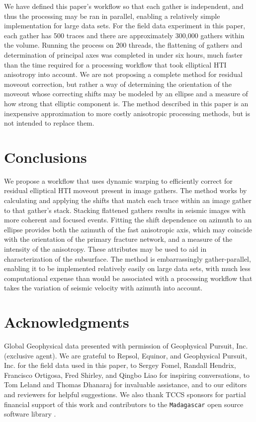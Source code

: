 We have defined this paper's workflow so that each gather is independent, and thus the processing may be ran in parallel, enabling a relatively simple implementation for large data sets.  For the field data experiment in this paper, each gather has 500 traces and there are approximately 300,000 gathers within the volume.  Running the process on 200 threads, the flattening of gathers and determination of principal axes was completed in under six hours, much faster than the time required for a processing workflow that took elliptical HTI anisotropy into account.  We are not proposing a complete method for residual moveout correction, but rather a way of determining the orientation of the moveout whose correcting shifts may be modeled by an ellipse and a measure of how strong that elliptic component is.  The method described in this paper is an inexpensive approximation to more costly anisotropic processing methods, but is not intended to replace them.


\section{Conclusions}
We propose a workflow that uses dynamic warping to efficiently correct for residual elliptical HTI moveout present in image gathers.  The method works by calculating and applying the shifts that match each trace within an image gather to that gather's stack.  Stacking flattened gathers results in seismic images with more coherent and focused events.   Fitting the shift dependence on azimuth to an ellipse provides both the azimuth of the fast anisotropic axis, which may coincide with the orientation of the primary fracture network, and a measure of the intensity of the anisotropy.  These attributes may be used to aid in characterization of the subsurface.  The method is embarrassingly gather-parallel, enabling it to be implemented relatively easily on large data sets, with much less computational expense than would be associated with a processing workflow that takes the variation of seismic velocity with azimuth into account.

\section{Acknowledgments}
Global Geophysical data presented with permission of Geophysical Pursuit, Inc. (exclusive agent).  We are grateful to Repsol, Equinor, and Geophysical Pursuit, Inc. for the field data used in this paper, to Sergey Fomel, Randall Hendrix, Francisco Ortigosa, Fred Shirley, and Qingbo Liao for inspiring conversations, to Tom Leland and Thomas Dhanaraj for invaluable assistance, and to our editors and reviewers for helpful suggestions. We also thank TCCS sponsors for partial financial support of this work and contributors to the \texttt{Madagascar} open source software library \cite[]{madagascar}. 


